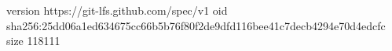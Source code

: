 version https://git-lfs.github.com/spec/v1
oid sha256:25dd06a1ed634675cc66b5b76f80f2de9dfd116bee41c7decb4294e70d4edcfc
size 118111
